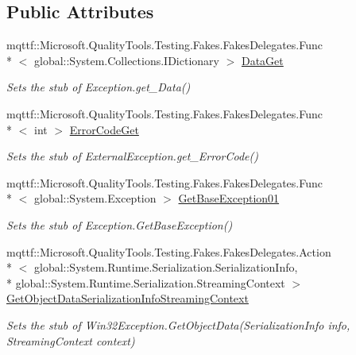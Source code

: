 \subsection*{Public Attributes}
\begin{DoxyCompactItemize}
\item 
mqttf\-::\-Microsoft.\-Quality\-Tools.\-Testing.\-Fakes.\-Fakes\-Delegates.\-Func\\*
$<$ global\-::\-System.\-Collections.\-I\-Dictionary $>$ \hyperlink{class_system_1_1_component_model_1_1_fakes_1_1_stub_win32_exception_a965c61a4481908feb2f9b4b16b7c82c8}{Data\-Get}
\begin{DoxyCompactList}\small\item\em Sets the stub of Exception.\-get\-\_\-\-Data()\end{DoxyCompactList}\item 
mqttf\-::\-Microsoft.\-Quality\-Tools.\-Testing.\-Fakes.\-Fakes\-Delegates.\-Func\\*
$<$ int $>$ \hyperlink{class_system_1_1_component_model_1_1_fakes_1_1_stub_win32_exception_a6d307b4be488d527f346d389d18d7d8c}{Error\-Code\-Get}
\begin{DoxyCompactList}\small\item\em Sets the stub of External\-Exception.\-get\-\_\-\-Error\-Code()\end{DoxyCompactList}\item 
mqttf\-::\-Microsoft.\-Quality\-Tools.\-Testing.\-Fakes.\-Fakes\-Delegates.\-Func\\*
$<$ global\-::\-System.\-Exception $>$ \hyperlink{class_system_1_1_component_model_1_1_fakes_1_1_stub_win32_exception_a07d314d55173a18e4de4f1585e468c4c}{Get\-Base\-Exception01}
\begin{DoxyCompactList}\small\item\em Sets the stub of Exception.\-Get\-Base\-Exception()\end{DoxyCompactList}\item 
mqttf\-::\-Microsoft.\-Quality\-Tools.\-Testing.\-Fakes.\-Fakes\-Delegates.\-Action\\*
$<$ global\-::\-System.\-Runtime.\-Serialization.\-Serialization\-Info, \\*
global\-::\-System.\-Runtime.\-Serialization.\-Streaming\-Context $>$ \hyperlink{class_system_1_1_component_model_1_1_fakes_1_1_stub_win32_exception_aec95b522ae0f0a9dcc2ec919633f25e1}{Get\-Object\-Data\-Serialization\-Info\-Streaming\-Context}
\begin{DoxyCompactList}\small\item\em Sets the stub of Win32\-Exception.\-Get\-Object\-Data(\-Serialization\-Info info, Streaming\-Context context)\end{DoxyCompactList}\item 

\end{DoxyCompactItemize}
